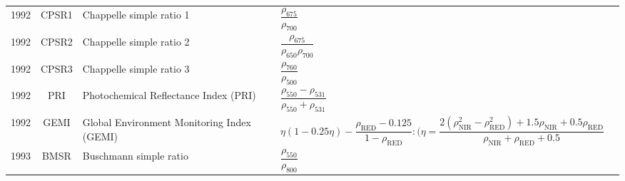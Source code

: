 \documentclass[10pt]{article}
\begin{document}
\begin{ThreePartTable}
\begin{longtable}{c c m{2.80in} M{2.80in} M{1.5in}}
  1992 & CPSR1   & Chappelle simple ratio 1                                                       & $\dfrac{\rho_{675}}{\rho_{700}}$                                                                                                                                                                                                                                                        & \citet{Chappelle1992}                               \\
  1992 & CPSR2   & Chappelle simple ratio 2                                                       & $\dfrac{\rho_{675}}{\rho_{650}\rho_{700}}$                                                                                                                                                                                                                                              & \citet{Chappelle1992}                               \\
  1992 & CPSR3   & Chappelle simple ratio 3                                                       & $\dfrac{\rho_{760}}{\rho_{500}}$                                                                                                                                                                                                                                                        & \citet{Chappelle1992}                               \\
  1992 & PRI     & Photochemical Reflectance Index (PRI)                                          & $\dfrac{\rho_{550}-\rho_{531}}{\rho_{550}+\rho_{531}}$                                                                                                                                                                                                                                  & \citet{Gamon1992}                                   \\
  1992 & GEMI    & Global Environment Monitoring Index (GEMI)                                     & $\eta(1-0.25\eta)-\dfrac{\rho_\text{RED}-0.125}{1-\rho_\text{RED}}:(\eta=\dfrac{2(\rho_\text{NIR}^2-\rho_\text{RED}^2)+1.5\rho_\text{NIR}+0.5\rho_\text{RED}}{\rho_\text{NIR}+\rho_\text{RED}+0.5}$                                                                                     & \citet{Pinty1992}                                   \\
  1993 & BMSR    & Buschmann simple ratio                                                         & $\dfrac{\rho_{550}}{\rho_{800}}$                                                                                                                                                                                                                                                        & \citet{Buschmann1993}                               \\

\end{longtable}
\end{ThreePartTable}
\end{document}
